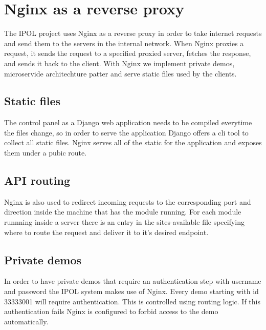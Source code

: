 
\section{Nginx as a reverse proxy}
\label{sec:reverse_proxy}
The IPOL project uses Nginx as a reverse proxy in order to take internet requests and send them to the servers in the 
internal network. When Nginx proxies a request, it sends the request to a specified proxied server, fetches the response, 
and sends it back to the client. With Nginx we implement private demos, microservide architechture patter and serve static 
files used by the clients.

\subsection{Static files}
The control panel as a Django web application needs to be compiled everytime the files change, so in order to serve the 
application Django offers a cli tool to collect all static files. Nginx serves all of the static for the application and exposes them 
under a pubic route.

\subsection{API routing}
Nginx is also used to redirect incoming requests to the corresponding port and direction inside the machine that has the 
module running. For each module runnning inside a server there is an entry in the sites-available file specifying where to 
route the request and deliver it to it's desired endpoint.

\subsection{Private demos}
In order to have private demos that require an authentication step with username and password the IPOL system makes 
use of Nginx. Every demo starting with id 33333001 will require authentication. This is controlled using routing logic. If this 
authentication fails Nginx is configured to forbid access to the demo automatically.

